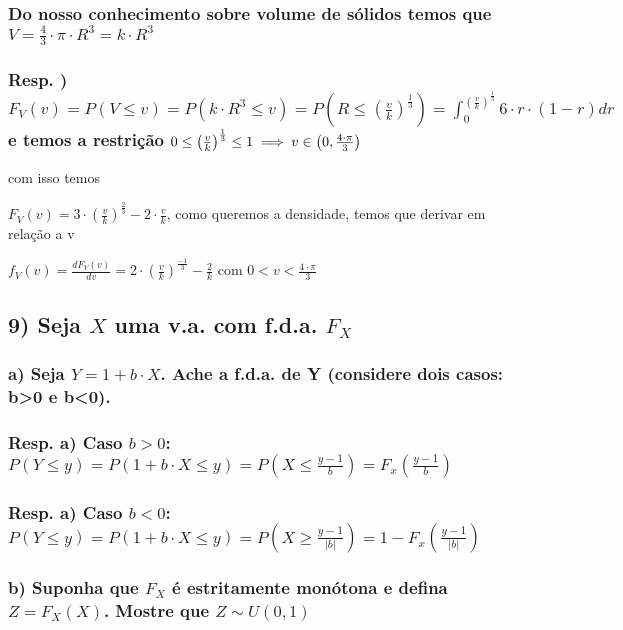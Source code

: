 \documentclass[english]{article}
\begin{document}
\subsubsection*{\textmd{Do nosso conhecimento sobre volume de sólidos temos que $V=\frac{4}{3}\cdot\pi\cdot R^{3}=k\cdot R^{3}$}}


\subsubsection*{\textmd{Resp. ) $F_{V}(v)=P(V\leq v)=P(k\cdot R^{3}\leq v)=P(R\leq\left(\frac{v}{k}\right)^{\frac{1}{3}})=\int_{0}^{\left(\frac{v}{k}\right)^{\frac{1}{3}}}6\cdot r\cdot(1-r)dr$
e temos a restrição $0\leq\left(\frac{v}{k}\right)^{\frac{1}{3}}\leq1\protect\implies v\in\left(0,\frac{4\cdot\pi}{3}\right)$}}

com isso temos

$F_{V}(v)=3\cdot\left(\frac{v}{k}\right)^{\frac{2}{3}}-2\cdot\frac{v}{k}$,
como queremos a densidade, temos que derivar em relação a v 

$f_{V}(v)=\frac{dF_{V}(v)}{dv}=2\cdot\left(\frac{v}{k}\right)^{\frac{-1}{3}}-\frac{2}{k}$
com $0<v<\frac{4\cdot\pi}{3}$

\textbf{\textcompwordmark{}}


\subsection*{\textmd{9) Seja $X$ uma v.a. com f.d.a. $F_{X}$}}


\subsubsection*{\textmd{a) Seja $Y=1+b\cdot X$. Ache a f.d.a. de Y (considere dois
casos: b>0 e b<0).}}


\subsubsection*{\textmd{Resp. a) Caso $b>0$: $P(Y\leq y)=P(1+b\cdot X\leq y)=P(X\leq\frac{y-1}{b})=F_{x}(\frac{y-1}{b})$}}


\subsubsection*{\textmd{Resp. a) Caso $b<0$: $P(Y\leq y)=P(1+b\cdot X\leq y)=P(X\geq\frac{y-1}{|b|})=1-F_{x}(\frac{y-1}{|b|})$}}


\subsubsection*{\textmd{b) Suponha que $F_{X}$ é estritamente monótona e defina
$Z=F_{X}(X)$. Mostre que $Z\sim U(0,1)$}}
\end{document}
